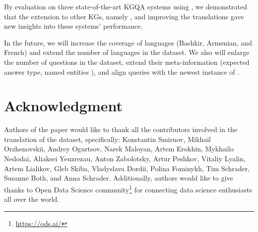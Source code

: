 \documentclass[conference]{IEEEtran}
\begin{document}
By evaluation on three state-of-the-art KGQA systems using \QALDplus, we demonstrated that the extension to other KGs, namely \Wikidata, and improving the translations gave new insights into these systems' performance.

In the future, we will increase the coverage of languages (\eg Bashkir, Armenian, and French) and extend the number of languages in the dataset.
We also will enlarge the number of questions in the dataset, extend their meta-information (\eg expected answer type, named entities \etc), and align \SPARQL queries with the newest instance of \DBpedia.


\section*{Acknowledgment}

Authors of the paper would like to thank all the contributors involved in the translation of the dataset, specifically: Konstantin Smirnov, Mikhail Orzhenovskii, Andrey Ogurtsov, Narek Maloyan, Artem Erokhin, Mykhailo Nedodai, Aliaksei Yeuzrezau, Anton Zabolotsky, Artur Peshkov, Vitaliy Lyalin, Artem Lialikov, Gleb Skiba, Vladyslava Dordii, Polina Fominykh, Tim Schrader, Susanne Both, and Anna Schrader.
Additionally, authors would like to give thanks to Open Data Science community\footnote{\url{https://ods.ai/}} for connecting data science enthusiasts all over the world.









\end{document}
